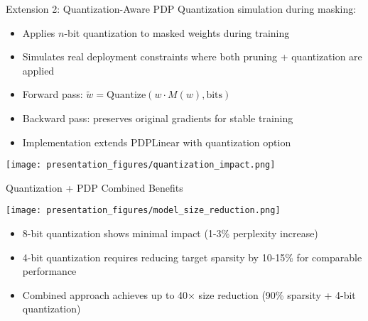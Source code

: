 \documentclass{beamer}
\begin{document}
\begin{frame}{Extension 2: Quantization-Aware PDP}
Quantization simulation during masking:
\begin{itemize}
    \item Applies $n$-bit quantization to masked weights during training
    \item Simulates real deployment constraints where both pruning + quantization are applied
    \item Forward pass: $\tilde{w} = \text{Quantize}(w \cdot M(w), \text{bits})$
    \item Backward pass: preserves original gradients for stable training
    \item Implementation extends PDPLinear with quantization option
\end{itemize}
\begin{center}
\texttt{[image: presentation\_figures/quantization\_impact.png]}
\end{center}
\end{frame}

\begin{frame}{Quantization + PDP Combined Benefits}
\begin{center}
\texttt{[image: presentation\_figures/model\_size\_reduction.png]}
\end{center}
\begin{itemize}
    \item 8-bit quantization shows minimal impact (1-3\% perplexity increase)
    \item 4-bit quantization requires reducing target sparsity by 10-15\% for comparable performance
    \item Combined approach achieves up to 40× size reduction (90\% sparsity + 4-bit quantization)
\end{itemize}
\end{frame}
\end{document}
